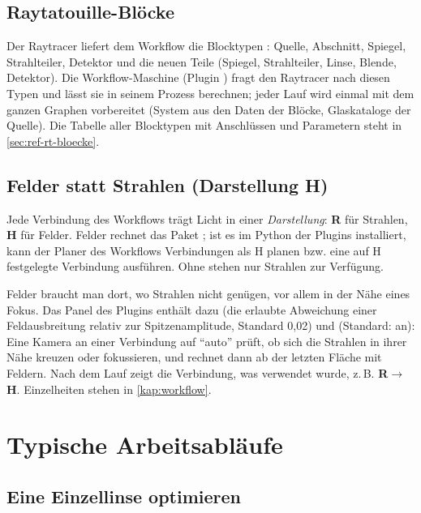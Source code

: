 \subsection{Raytatouille-Blöcke}

Der Raytracer liefert dem Workflow die Blocktypen : Quelle, Abschnitt, Spiegel,
Strahlteiler, Detektor und die neuen Teile  (Spiegel, Strahlteiler, Linse,
Blende, Detektor). Die Workflow-Maschine (Plugin ) fragt den Raytracer nach
diesen Typen und lässt sie in seinem Prozess berechnen; jeder Lauf wird einmal mit dem ganzen
Graphen vorbereitet (System aus den Daten der Blöcke, Glaskataloge der Quelle). Die Tabelle aller
Blocktypen mit Anschlüssen und Parametern steht in \autoref{sec:ref-rt-bloecke}.

\subsection{Felder statt Strahlen (Darstellung H)}\label{sec:rt-felder}

Jede Verbindung des Workflows trägt Licht in einer \emph{Darstellung}: \textbf{R} für Strahlen,
\textbf{H} für Felder. Felder rechnet das Paket ; ist es im Python der Plugins
installiert, kann der Planer des Workflows Verbindungen als H planen bzw. eine auf H festgelegte
Verbindung ausführen. Ohne  stehen nur Strahlen zur Verfügung.

Felder braucht man dort, wo Strahlen nicht genügen, vor allem in der Nähe eines Fokus. Das Panel
des Plugins  enthält dazu  (die erlaubte
Abweichung einer Feldausbreitung relativ zur Spitzenamplitude, Standard 0{,}02) und  (Standard: an): Eine Kamera an einer Verbindung auf
\enquote{auto} prüft, ob sich die Strahlen in ihrer Nähe kreuzen oder fokussieren, und rechnet
dann ab der letzten Fläche mit Feldern. Nach dem Lauf zeigt die Verbindung, was verwendet wurde,
z.\,B. \textbf{R$\to$H}. Einzelheiten stehen in \autoref{kap:workflow}.

\section{Typische Arbeitsabläufe}\label{sec:rt-ablaeufe}

\subsection{Eine Einzellinse optimieren}\label{sec:rt-ablauf-singlet}


